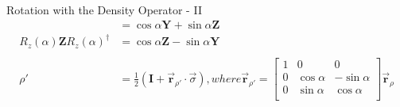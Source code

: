 \documentclass{beamer}
\begin{document}
\begin{frame}{Rotation with the Density Operator - II}
{\begin{align*}
            &=    \cos\alpha \mathbf{Y} + \sin\alpha \mathbf{Z} \\
      R_z(\alpha) \mathbf{Z} R_z(\alpha)^{\dagger}
            &=    \cos\alpha \mathbf{Z} - \sin\alpha \mathbf{Y} \\
      \\
      \rho' &= \frac{1}2 ( \mathbf{I} + \overrightarrow{\mathbf{r}}_{\rho'} \cdot \overrightarrow{\sigma} )
            , where \overrightarrow{\mathbf{r}}_{\rho'} =
              \begin{bmatrix}
                1 & 0          & 0 \\
                0 & \cos\alpha & -\sin\alpha \\
                0 & \sin\alpha & \cos\alpha \\
              \end{bmatrix}
              \overrightarrow{\mathbf{r}}_{\rho}
    \end{align*}
  }%
\end{frame}
\end{document}

